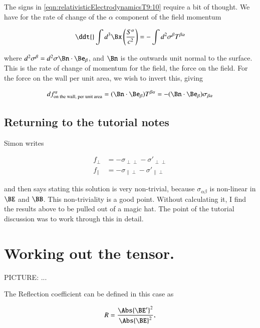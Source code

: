 The signs in \ref{eqn:relativisticElectrodynamicsT9:10} require a bit of thought.  We have for the rate of change of the $\alpha$ component of the field momentum

\begin{equation}\label{eqn:relativisticElectrodynamicsT9:11}
\ddt{} \int d^3 \Bx \left( \frac{S^\alpha}{c^2} \right) = - \int d^2 \sigma^\beta T^{\beta \alpha}
\end{equation}

where $d^2 \sigma^\beta = d^2 \sigma \Bn \cdot \Be_\beta$, and $\Bn$ is the outwards unit normal to the surface.  This is the rate of change of momentum for the field, the force on the field.  For the force on the wall per unit area, we wish to invert this, giving

\begin{equation}\label{eqn:relativisticElectrodynamicsT9:500}
df^\alpha_{\text{on the wall, per unit area}}
= (\Bn \cdot \Be_\beta) T^{\beta \alpha}
= -(\Bn \cdot \Be_\beta) \sigma_{\beta \alpha}
\end{equation}

\subsection{Returning to the tutorial notes}

Simon writes

\begin{align}\label{eqn:relativisticElectrodynamicsT9:30}
f_\perp &= - \sigma_{\perp \perp} - {\sigma'}_{\perp \perp} \\
f_\parallel &= - \sigma_{\parallel \perp} - {\sigma'}_{\parallel \perp} 
\end{align}

and then says stating this solution is very non-trivial, because $\sigma_{\alpha \beta}$ is non-linear in $\BE$ and $\BB$.  This non-triviality is a good point.  Without calculating it, I find the results above to be pulled out of a magic hat.  The point of the tutorial discussion was to work through this in detail.

\section{Working out the tensor.}

PICTURE: ...

The Reflection coefficient can be defined in this case as

\begin{equation}\label{eqn:relativisticElectrodynamicsT9:50}
R = \frac{ \Abs{\BE'}^2 }{ \Abs{\BE}^2 },
\end{equation}

